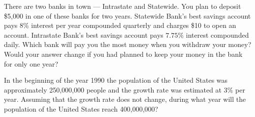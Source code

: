 \documentclass{ximera}
\begin{document}
\begin{exercise} \label{c3.1.9}
There are two banks in town --- Intrastate and Statewide.  You plan
to deposit \$5,000 in one of these banks for two years.  Statewide Bank's
best savings account pays $8\%$ interest per year compounded quarterly
and charges \$10 to open an account.  Intrastate Bank's best savings
account pays $7.75\%$ interest compounded daily.  Which bank will
pay you the most money when you withdraw your money?  Would your
answer change if you had planned to keep your money in the bank
for only one year?
\end{exercise}

\begin{exercise} \label{c3.1.10}
In the beginning of the year 1990 the population of the United States was
approximately 250,000,000 people and the growth rate was estimated at $3\%$
per year.  Assuming that the growth rate does not change, during what year
will the population of the United States reach 400,000,000?
\end{exercise}
\end{document}
